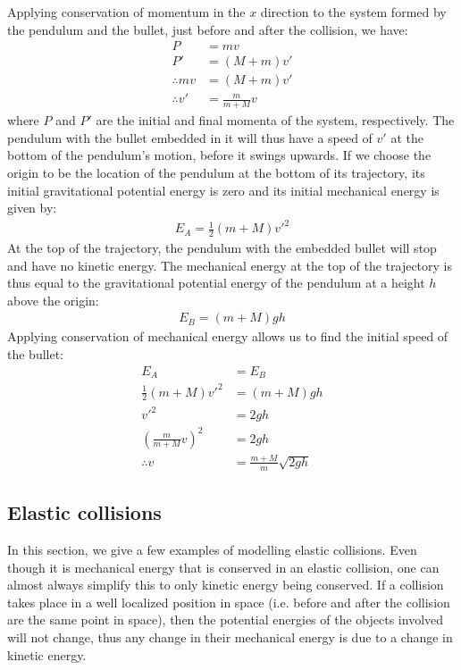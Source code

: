 \begin{example}
Applying conservation of momentum in the $x$ direction to the system formed by the pendulum and the bullet, just before and after the collision, we have:
\begin{align*}
P &= mv\\
P' &= (M+m)v'\\
\therefore mv &= (M+m)v'\\
\therefore v' &= \frac{m}{m+M}v
\end{align*}
where $P$ and $P'$ are the initial and final momenta of the system, respectively. The pendulum with the bullet embedded in it will thus have a speed of $v'$ at the bottom of the pendulum's motion, before it swings upwards. If we choose the origin to be the location of the pendulum at the bottom of its trajectory, its initial gravitational potential energy is zero and its initial mechanical energy is given by:
\begin{align*}
E_A = \frac{1}{2}(m+M) v'^2 
\end{align*}
At the top of the trajectory, the pendulum with the embedded bullet will stop and have no kinetic energy. The mechanical energy at the top of the trajectory is thus equal to the gravitational potential energy of the pendulum at a height $h$ above the origin:
\begin{align*}
E_B = (m+M)gh
\end{align*}
Applying conservation of mechanical energy allows us to find the initial speed of the bullet:
\begin{align*}
E_A &= E_B\\
\frac{1}{2}(m+M) v'^2 &= (m+M)gh\\
v'^2 &= 2gh\\
\left( \frac{m}{m+M}v\right)^2&= 2gh\\
\therefore v &= \frac{m+M}{m} \sqrt{2gh}
\end{align*}

\end{example}


\subsection{Elastic collisions}
In this section, we give a few examples of modelling elastic collisions. Even though it is mechanical energy that is conserved in an elastic collision, one can almost always simplify this to only kinetic energy being conserved. If a collision takes place in a well localized position in space (i.e. before and after the collision are the same point in space), then the potential energies of the objects involved will not change, thus any change in their mechanical energy is due to a change in kinetic energy.


